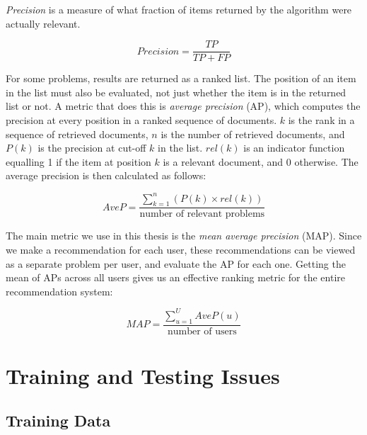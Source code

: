 \emph{Precision} is a measure of what fraction of items returned by
the algorithm were actually relevant.

\[
Precision = \frac {TP} {TP + FP}
\]

For some problems, results are returned as a ranked list. The position
of an item in the list must also be evaluated, not just whether the
item is in the returned list or not. A metric that does this is
\emph{average precision} (AP), which computes the precision at every
position in a ranked sequence of documents. $k$ is the rank in a
sequence of retrieved documents, $n$ is the number of retrieved
documents, and $P(k)$ is the precision at cut-off $k$ in the
list. $rel(k)$ is an indicator function equalling 1 if the item at
position $k$ is a relevant document, and 0 otherwise. The average
precision is then calculated as follows:

\[
AveP = \frac{\sum_{k=1}^n(P(k) \times rel(k))}{\text{number of relevant problems}}
\]

The main metric we use in this thesis is the \emph{mean average
precision} (MAP). Since we make a recommendation for each user, these
recommendations can be viewed as a separate problem per user, and
evaluate the AP for each one. Getting the mean of APs across all users
gives us an effective ranking metric for the entire recommendation system:

\[
MAP = \frac{\sum_{u=1}^U AveP(u)}{\text{number of users}}
\]

\section{Training and Testing Issues}

\subsection{Training Data}

